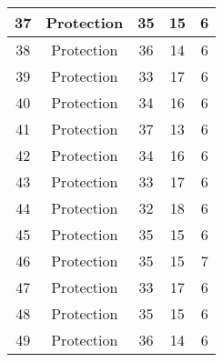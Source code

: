 \documentclass[results.tex]{subfiles}
\begin{document}
\begin{center}
\begin{tabular}{| c || c | c | c | c |}
            \hline
            37                      & Protection                   & 35                     & 15                      & 6                    \\
            \hline
            38                      & Protection                   & 36                     & 14                      & 6                    \\
            \hline
            39                      & Protection                   & 33                     & 17                      & 6                    \\
            \hline
            40                      & Protection                   & 34                     & 16                      & 6                    \\
            \hline
            41                      & Protection                   & 37                     & 13                      & 6                    \\
            \hline
            42                      & Protection                   & 34                     & 16                      & 6                    \\
            \hline
            43                      & Protection                   & 33                     & 17                      & 6                    \\
            \hline
            44                      & Protection                   & 32                     & 18                      & 6                    \\
            \hline
            45                      & Protection                   & 35                     & 15                      & 6                    \\
            \hline
            46                      & Protection                   & 35                     & 15                      & 7                    \\
            \hline
            47                      & Protection                   & 33                     & 17                      & 6                    \\
            \hline
            48                      & Protection                   & 35                     & 15                      & 6                    \\
            \hline
            49                      & Protection                   & 36                     & 14                      & 6                    \\
            \hline
        \end{tabular}
    \end{center}
\end{document}
